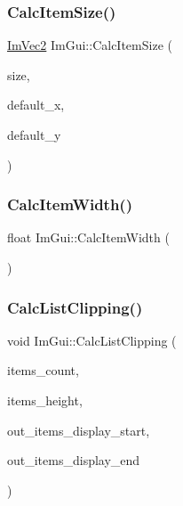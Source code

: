 \hypertarget{namespace_im_gui_a3c1505e785f9571ed82500692a727c5f}{}\label{namespace_im_gui_a3c1505e785f9571ed82500692a727c5f} 
\subsubsection{\texorpdfstring{Calc\+Item\+Size()}{CalcItemSize()}}
{\footnotesize\ttfamily \hyperlink{struct_im_vec2}{Im\+Vec2} Im\+Gui\+::\+Calc\+Item\+Size (\begin{DoxyParamCaption}\item[{\hyperlink{struct_im_vec2}{Im\+Vec2}}]{size,  }\item[{float}]{default\+\_\+x,  }\item[{float}]{default\+\_\+y }\end{DoxyParamCaption})}

\hypertarget{namespace_im_gui_ab3b3ba92ebd8bca4a552dd93321a1994}{}\label{namespace_im_gui_ab3b3ba92ebd8bca4a552dd93321a1994} 
\subsubsection{\texorpdfstring{Calc\+Item\+Width()}{CalcItemWidth()}}
{\footnotesize\ttfamily float Im\+Gui\+::\+Calc\+Item\+Width (\begin{DoxyParamCaption}{ }\end{DoxyParamCaption})}

\hypertarget{namespace_im_gui_ae5319370628374ef8febf0c25c285b7e}{}\label{namespace_im_gui_ae5319370628374ef8febf0c25c285b7e} 
\subsubsection{\texorpdfstring{Calc\+List\+Clipping()}{CalcListClipping()}}
{\footnotesize\ttfamily void Im\+Gui\+::\+Calc\+List\+Clipping (\begin{DoxyParamCaption}\item[{int}]{items\+\_\+count,  }\item[{float}]{items\+\_\+height,  }\item[{int $\ast$}]{out\+\_\+items\+\_\+display\+\_\+start,  }\item[{int $\ast$}]{out\+\_\+items\+\_\+display\+\_\+end }\end{DoxyParamCaption})}

